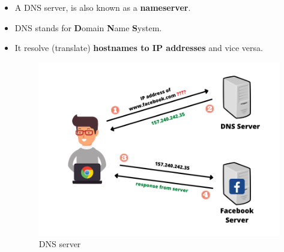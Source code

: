 \setlength{\columnsep}{3pt}
\begin{flushleft}
	\bigskip
	\begin{itemize}
		
		\item A DNS server, is also known as a \textbf{nameserver}.
		\item DNS stands for \textbf{D}omain \textbf{N}ame \textbf{S}ystem.
		\item It resolve (translate) \textbf{hostnames to IP addresses} and vice versa. 


		\begin{figure}[h!]
			\centering
			\includegraphics[scale=.6]{content/chapter3/images/dns2.png}
			\caption{DNS server}
			\label{fig:dns_server}
		\end{figure}
	
	\end{itemize}
\end{flushleft}

\newpage





